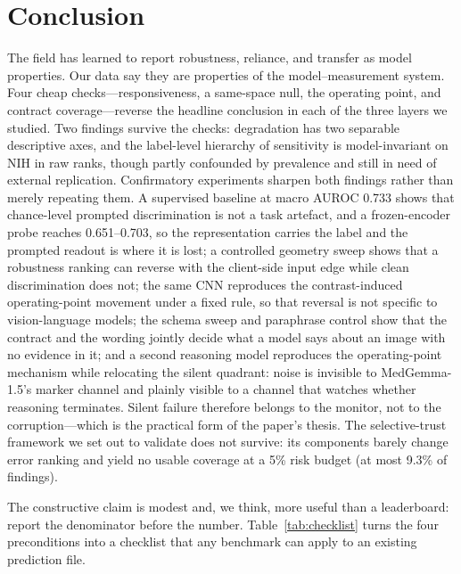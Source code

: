 \section*{Conclusion}
\label{sec:conclusion}

The field has learned to report robustness, reliance, and transfer as model properties. Our data say they are properties of the model--measurement system. Four cheap checks---responsiveness, a same-space null, the operating point, and contract coverage---reverse the headline conclusion in each of the three layers we studied. Two findings survive the checks: degradation has two separable descriptive axes, and the label-level hierarchy of sensitivity is model-invariant on NIH in raw ranks, though partly confounded by prevalence and still in need of external replication. Confirmatory experiments sharpen both findings rather than merely repeating them. A supervised baseline at macro AUROC 0.733 shows that chance-level prompted discrimination is not a task artefact, and a frozen-encoder probe reaches 0.651--0.703, so the representation carries the label and the prompted readout is where it is lost; a controlled geometry sweep shows that a robustness ranking can reverse with the client-side input edge while clean discrimination does not; the same CNN reproduces the contrast-induced operating-point movement under a fixed rule, so that reversal is not specific to vision-language models; the schema sweep and paraphrase control show that the contract and the wording jointly decide what a model says about an image with no evidence in it; and a second reasoning model reproduces the operating-point mechanism while relocating the silent quadrant: noise is invisible to MedGemma-1.5's marker channel and plainly visible to a channel that watches whether reasoning terminates. Silent failure therefore belongs to the monitor, not to the corruption---which is the practical form of the paper's thesis. The selective-trust framework we set out to validate does not survive: its components barely change error ranking and yield no usable coverage at a 5\% risk budget (at most 9.3\% of findings).

The constructive claim is modest and, we think, more useful than a leaderboard: report the denominator before the number. Table~\ref{tab:checklist} turns the four preconditions into a checklist that any benchmark can apply to an existing prediction file.

